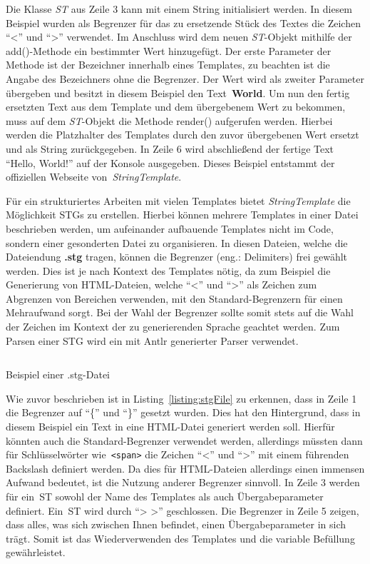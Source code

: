 Die Klasse \textit{ST} aus Zeile 3 kann mit einem String initialisiert werden.
In diesem Beispiel wurden als Begrenzer für das zu ersetzende Stück des Textes die Zeichen ``<''  und ``>'' verwendet.
Im Anschluss wird dem neuen \textit{ST}-Objekt mithilfe der add()-Methode ein bestimmter Wert hinzugefügt.
Der erste Parameter der Methode ist der Bezeichner innerhalb eines Templates, zu beachten ist die Angabe des Bezeichners ohne die Begrenzer.
Der Wert wird als zweiter Parameter übergeben und besitzt in diesem Beispiel den Text~\textbf{World}.
Um nun den fertig ersetzten Text aus dem Template und dem übergebenem Wert zu bekommen, muss auf dem \textit{ST}-Objekt die Methode render() aufgerufen werden.
Hierbei werden die Platzhalter des Templates durch den zuvor übergebenen Wert ersetzt und als String zurückgegeben.
In Zeile 6 wird abschließend der fertige Text ``Hello, World!''  auf der Konsole ausgegeben.
Dieses Beispiel entstammt der offiziellen Webseite von~\textit{StringTemplate}\cite*{stOrg}.

Für ein strukturiertes Arbeiten mit vielen Templates bietet \textit{StringTemplate} die Möglichkeit \acp{STG} zu erstellen.
Hierbei können mehrere Templates in einer Datei beschrieben werden, um aufeinander aufbauende Templates nicht im Code, sondern einer gesonderten Datei zu organisieren.
In diesen Dateien, welche die Dateiendung \textbf{.stg} tragen, können die Begrenzer (eng.: Delimiters) frei gewählt werden.
Dies ist je nach Kontext des Templates nötig, da zum Beispiel die Generierung von HTML-Dateien, welche ``<''  und ``>'' als Zeichen zum Abgrenzen von Bereichen verwenden,
mit den Standard-Begrenzern für einen Mehraufwand sorgt.
Bei der Wahl der Begrenzer sollte somit stets auf die Wahl der Zeichen im Kontext der zu generierenden Sprache geachtet werden.
Zum Parsen einer \ac{STG} wird ein mit \ac{Antlr} generierter Parser verwendet\cite*{stgParser}.

\begin{listing}[ht]
    \inputminted{c}{listings/2.2.1/Example.stg}
    \caption{Beispiel einer .stg-Datei}
    \label{listing:stgFile}
\end{listing}

Wie zuvor beschrieben ist in Listing~\ref{listing:stgFile} zu erkennen, dass in Zeile 1 die Begrenzer auf ``\{'' und ``\}'' gesetzt wurden.
Dies hat den Hintergrund, dass in diesem Beispiel ein Text in eine HTML-Datei generiert werden soll.
Hierfür könnten auch die Standard-Begrenzer verwendet werden, allerdings müssten dann für Schlüsselwörter wie~\texttt{<span>} die Zeichen ``<'' und ``>'' mit einem führenden Backslash definiert werden.
Da dies für HTML-Dateien allerdings einen immensen Aufwand bedeutet, ist die Nutzung anderer Begrenzer sinnvoll.
In Zeile 3 werden für ein~\ac{ST} sowohl der Name des Templates als auch Übergabeparameter definiert.
Ein~\ac{ST} wird durch ``> >'' geschlossen.
Die Begrenzer in Zeile 5 zeigen, dass alles, was sich zwischen Ihnen befindet, einen Übergabeparameter in sich trägt.
Somit ist das Wiederverwenden des Templates und die variable Befüllung gewährleistet.


